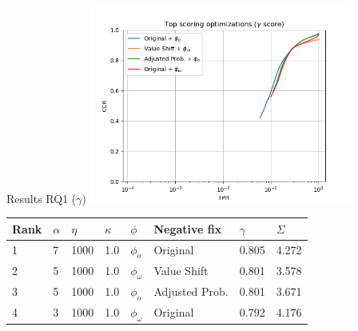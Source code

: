 \begin{frame}{Results RQ1 ($\gamma$)}
	\centering
	\includegraphics[width=0.65\textwidth]{figures/Top-gamma.png}
	\footnotesize{\begin{tabularx}{\textwidth}{ |X|X|X|X|X|l|X|X| }
			\hline
			Rank & $\alpha$ & $\eta$ & $\kappa$ & $\phi$        & Negative fix   & $\gamma$ & $\Sigma$ \\
			\hline
			1    & 7        & 1000   & 1.0      & $\phi_o$      & Original       & 0.805    & 4.272    \\
			2    & 5        & 1000   & 1.0      & $\phi_\omega$ & Value Shift    & 0.801    & 3.578    \\
			3    & 5        & 1000   & 1.0      & $\phi_o$      & Adjusted Prob. & 0.801    & 3.671    \\
			4    & 3        & 1000   & 1.0      & $\phi_\omega$ & Original       & 0.792    & 4.176    \\
			\hline
		\end{tabularx}
	}
\end{frame}

